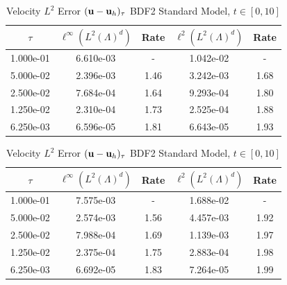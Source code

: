 \documentclass[letterpaper]{erdc}
\begin{document}
\begin{table}[h!]
  \parbox{.45\linewidth}{
  \tiny
  \centering
    \caption{Velocity $L^2$ Error $(\textbf{u} - \textbf{u}_h)_{\tau}$ BDF2 Rotational Model, $t\in[0,10]$}
    \begin{tabular}{c|c|c|c|c}
      $\tau$ &  $\ell^{\infty}\left(L^2(\Lambda)^d\right)$ &  Rate  &  $\ell^2\left(L^2(\Lambda)^d\right)$  &  Rate\\
      \hline
      1.000e-01 & 6.610e-03 &   -  & 1.042e-02 &   - \\
      5.000e-02 & 2.396e-03 & 1.46 & 3.242e-03 & 1.68\\
      2.500e-02 & 7.684e-04 & 1.64 & 9.293e-04 & 1.80\\
      1.250e-02 & 2.310e-04 & 1.73 & 2.525e-04 & 1.88\\
      6.250e-03 & 6.596e-05 & 1.81 & 6.643e-05 & 1.93
    \end{tabular}
    }
    \hfill
    \parbox{.45\linewidth}{
    \tiny
    \centering
      \caption{Velocity $L^2$ Error $(\textbf{u} - \textbf{u}_h)_{\tau}$ BDF2 Standard Model, $t\in[0,10]$}
      \begin{tabular}{c|c|c|c|c}
        $\tau$ &  $\ell^{\infty}\left(L^2(\Lambda)^d\right)$ &  Rate  &  $\ell^2\left(L^2(\Lambda)^d\right)$  &  Rate\\
        \hline
        1.000e-01 & 7.575e-03 &   -  & 1.688e-02 &   - \\
        5.000e-02 & 2.574e-03 & 1.56 & 4.457e-03 & 1.92\\
        2.500e-02 & 7.988e-04 & 1.69 & 1.139e-03 & 1.97\\
        1.250e-02 & 2.375e-04 & 1.75 & 2.883e-04 & 1.98\\
        6.250e-03 & 6.692e-05 & 1.83 & 7.264e-05 & 1.99
      \end{tabular}
    }
\end{table}
\end{document}
